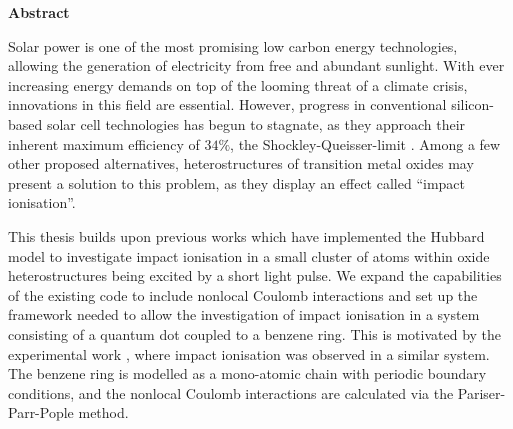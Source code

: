 \def\changemargin#1#2{\list{}{\rightmargin#2\leftmargin#1}\item[]}
\let\endchangemargin=\endlist 

{\small\begin{center}%
\bfseries{Abstract}
\end{center}}

\begin{changemargin}{1.5cm}{1.5cm}

Solar power is one of the most promising low carbon energy technologies, allowing the generation of electricity from free and abundant sunlight. With ever increasing energy demands on top of the looming threat of a climate crisis, innovations in this field are essential. However, progress in conventional silicon-based solar cell technologies has begun to stagnate, as they approach their inherent maximum efficiency of $34\%$, the Shockley-Queisser-limit \cite{shockley_queisser}. Among a few other proposed alternatives, heterostructures of transition metal oxides may present a solution to this problem, as they display an effect called ``impact ionisation''.

\smallskip

This thesis builds upon previous works \cite{innerberger, worm_bachelor, prauhart, worm_project} which have implemented the Hubbard model to investigate impact ionisation in a small cluster of atoms within oxide heterostructures being excited by a short light pulse. We expand the capabilities of the existing code to include nonlocal Coulomb interactions and set up the framework needed to allow the investigation of impact ionisation in a system consisting of a quantum dot coupled to a benzene ring.
This is motivated by the experimental work \cite{qd_motivation}, where impact ionisation was observed in a similar system.
The benzene ring is modelled as a mono-atomic chain with periodic boundary conditions, and the nonlocal Coulomb interactions are calculated via the Pariser-Parr-Pople method. 
\end{changemargin}